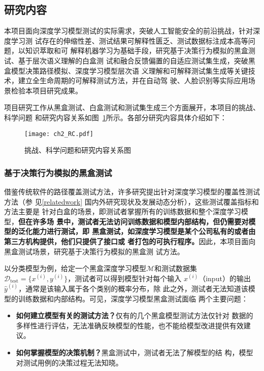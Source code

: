 \subsection{研究内容}\label{ch2content}

本项目面向深度学习模型测试的实际需求，突破人工智能安全的前沿挑战，针对深度学习测
试存在的伸缩性差、测试结果可解释性匮乏、测试数据标注成本高等问题，以知识萃取和可
解释机器学习为基础手段，研究基于决策行为模拟的黑盒测试、基于层次语义理解的白盒测
试和融合反馈偏置的自适应测试集生成，突破黑盒模型决策路径模拟、深度学习模型层次语
义理解和可解释测试集生成等关键技术，建立全生命周期的可解释测试方法，并在自动驾
驶、人脸识别等实际应用场景检验本项目研究成果。


项目研究工作从黑盒测试、白盒测试和测试集生成三个方面展开，本项目的挑战、科学问题
和研究内容关系如图~\ref{fig:ch2:rc}所示。各部分研究内容具体介绍如下：

\begin{figure}[htp]
    \begin{small}
        \begin{center}
            \texttt{[image: ch2\_RC.pdf]}
        \end{center}
        \caption{挑战、科学问题和研究内容关系图}
        \label{fig:ch2:rc}
    \end{small}
\end{figure}

\subsubsection{基于决策行为模拟的黑盒测试}

借鉴传统软件的路径覆盖测试方法，许多研究提出针对深度学习模型的覆盖性测试方法（参
见\ref{relatedwork} 国内外研究现状及发展动态分析），这些测试覆盖指标和方法主要是
针对白盒的场景，即测试者掌握所有的训练数据和整个深度学习模型，\textbf{但在许多场
景中，测试者无法访问训练数据和模型内部结构，但仍需要对模型的泛化能力进行测试，即
黑盒测试，如深度学习模型是某个公司私有的或者由第三方机构提供，他们只提供了接口或
者打包的可执行程序。}因此，本项目面向黑盒测试场景，研究基于决策行为模拟的黑盒测
试方法。

以分类模型为例，给定一个黑盒深度学习模型$\mathcal M$和测试数据集$\mathcal
D_{\text{test}}=\{x^{(i)},y^{(i)}\}$，测试者可以得到模型针对每个输入
$x^{(i)}$（input）的输出$\hat{y}^{(i)}$，通常是该输入属于各个类别的概率分布，除
此之外，测试者无法知道该模型的训练数据和内部结构。可见，深度学习模型黑盒测试面临
两个主要问题：
\begin{itemize}
    \item \textbf{如何建立模型有关的测试方法？}仅有的几个黑盒模型测试方法仅针对
    数据的多样性进行评估，无法准确反映模型的性能，也不能给模型改进提供有效建议。
    \item \textbf{如何掌握模型的决策机制？}黑盒测试中，测试者无法了解模型的结
    构，模型对测试用例的决策过程无法知晓。
\end{itemize}


